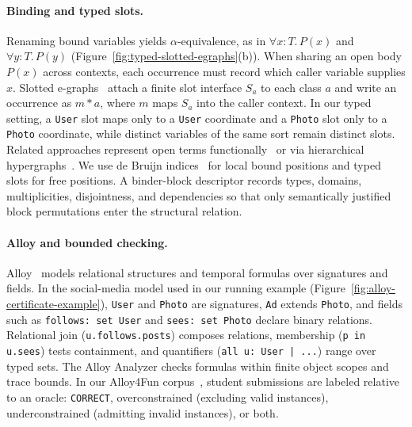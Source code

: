 \paragraph{Binding and typed slots.}
Renaming bound variables yields $\alpha$-equivalence, as in
$\forall x{:}T.\,P(x)$ and $\forall y{:}T.\,P(y)$
(Figure~\ref{fig:typed-slotted-egraphs}(b)). When sharing an open body $P(x)$
across contexts, each occurrence must record which caller variable supplies $x$.
Slotted e-graphs~\cite{slottedEGraphs} attach a finite slot interface $S_a$ to
each class $a$ and write an occurrence as $m*a$, where $m$ maps $S_a$ into the
caller context. In our typed setting, a \texttt{User} slot maps only to a
\texttt{User} coordinate and a \texttt{Photo} slot only to a \texttt{Photo}
coordinate, while distinct variables of the same sort remain distinct slots.
Related approaches represent open terms functionally~\cite{zucker2026lifting} or
via hierarchical hypergraphs~\cite{egBindings}. We use de Bruijn
indices~\cite{deBruijn,maziarz2021HashingAlpha} for local bound positions and
typed slots for free positions. A binder-block descriptor records types,
domains, multiplicities, disjointness, and dependencies so that only
semantically justified block permutations enter the structural relation.

\paragraph{Alloy and bounded checking.}
Alloy~\cite{alloy,kodkod} models relational structures and temporal formulas
over signatures and fields. In the social-media model used in our running
example (Figure~\ref{fig:alloy-certificate-example}), \texttt{User} and
\texttt{Photo} are signatures, \texttt{Ad} extends \texttt{Photo}, and fields
such as \texttt{follows: set User} and \texttt{sees: set Photo} declare binary
relations. Relational join (\texttt{u.follows.posts}) composes relations,
membership (\texttt{p in u.sees}) tests containment, and quantifiers
(\texttt{all u: User | ...}) range over typed sets. The Alloy Analyzer checks
formulas within finite object scopes and trace bounds. In our Alloy4Fun
corpus~\cite{alloy4funDataset2023,alloy4fun,novice}, student submissions are
labeled relative to an oracle: \texttt{CORRECT}, overconstrained (excluding
valid instances), underconstrained (admitting invalid instances), or both.

